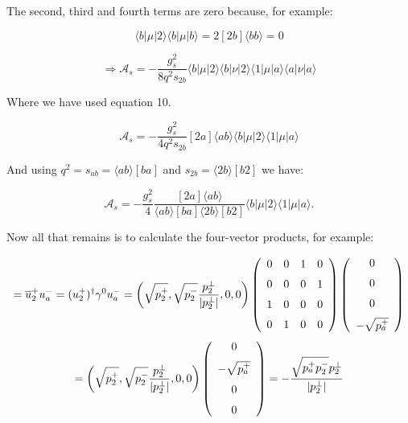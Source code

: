 			The second, third and fourth terms are zero because, for example:

			\begin{equation}
			\langle b|\mu|2\rangle\langle b|\mu|b\rangle = 2[2b]\langle b b\rangle = 0
			\end{equation}

			\begin{equation}
			\Rightarrow\mathcal{A}_s=-\frac{g^2_s}{8q^2s_{2b}}\langle{b}|\mu|2\rangle\langle{b}|\nu|2\rangle\langle{1}|\mu|a\rangle\langle{a}|\nu|a\rangle
			\end{equation}

			Where we have used equation 10.

			\begin{equation}
			\mathcal{A}_s=-\frac{g^2_s}{4q^2s_{2b}}[2a]\langle ab\rangle\langle{b}|\mu|2\rangle\langle{1}|\mu|a\rangle
			\end{equation}

			And using $q^2=s_{ab}=\langle ab\rangle[ba]$ and $s_{2b}=\langle2b\rangle[b2]$ we have:

			\begin{equation}
			\mathcal{A}_s=-\frac{g^2_s}{4}\frac{[2a]\langle ab\rangle}{\langle ab\rangle[ba]\langle2b\rangle[b2]}\langle{b}|\mu|2\rangle\langle{1}|\mu|a\rangle.
			\end{equation}

			Now all that remains is to calculate the four-vector products, for example:

			\begin{equation}
			[2a]=\overline{u}^+_2u^-_a=(u^+_2)^\dagger\gamma^0u^-_a=\left(\sqrt{p^+_2}, \sqrt{p^-_2}\frac{p^{\perp}_2}{|p_2^\perp|}, 0, 0\right) \left(\begin {array}{cccc} 0&0&1&0\\ \noalign{\medskip}0&0&0&1
			\\ \noalign{\medskip}1&0&0&0\\ \noalign{\medskip}0&1&0&0\end {array}\right)\left( \begin {array}{c} 0\\ \noalign{\medskip}0\\ \noalign{\medskip}0\\ \noalign{\medskip}-\sqrt{p^+_a}\end {array}\right)
			\end{equation}
			\begin{equation}
			[2a]=\left(\sqrt{p^+_2}, \sqrt{p^-_2}\frac{p^{\perp}_2}{|p_2^\perp|}, 0, 0\right)\left( \begin {array}{c} 0\\ \noalign{\medskip}-\sqrt{p^+_a}\\
			\noalign{\medskip}0\\ \noalign{\medskip}0\end {array}\right)=-\frac{\sqrt{p_a^+p_2^-}p_2^\perp}{|p_2^\perp|}
			\end{equation}

